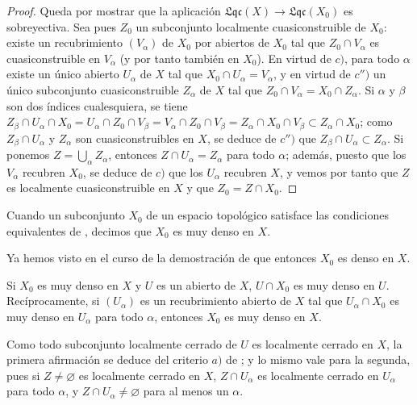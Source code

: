 \begin{proof}
Queda por mostrar que la aplicación $\mathfrak{Lqc}(X)\to\mathfrak{Lqc}(X_0)$ es sobreyectiva.
Sea pues $Z_0$ un subconjunto localmente cuasiconstruible de $X_0$: existe un recubrimiento $(V_\alpha)$ de $X_0$ por abiertos de $X_0$ tal que $Z_0\cap V_\alpha$ es cuasiconstruible en $V_\alpha$ (y
por tanto también en $X_0$).
En virtud de $c)$, para todo $\alpha$ existe un único abierto $U_\alpha$ de $X$ tal que $X_0\cap U_\alpha=V_\alpha$, y en virtud de $c'')$ un único subconjunto cuasiconstruible $Z_\alpha$ de $X$ tal que $Z_0\cap V_\alpha=X_0\cap Z_\alpha$.
Si $\alpha$ y $\beta$ son dos índices cualesquiera, se tiene $Z_\beta\cap U_\alpha\cap X_0=U_\alpha\cap Z_0\cap V_\beta=V_\alpha\cap Z_0\cap V_\beta=Z_\alpha\cap X_0\cap V_\beta\subset Z_\alpha\cap X_0$; como $Z_\beta\cap U_\alpha$ y $Z_\alpha$ son cuasiconstruibles en $X$, se deduce de $c'')$ que $Z_\beta\cap U_\alpha\subset Z_\alpha$.
Si ponemos $Z=\bigcup_\alpha Z_\alpha$, entonces $Z\cap U_\alpha=Z_\alpha$ para todo $\alpha$; además, puesto que los $V_\alpha$ recubren $X_0$, se deduce de $c)$ que los $U_\alpha$ recubren $X$, y vemos por tanto que $Z$ es localmente cuasiconstruible en $X$ y que $Z_0=Z\cap X_0$.
\end{proof}

\begin{definition}[10.1.3]
\label{IV.10.1.3}
Cuando un subconjunto $X_0$ de un espacio topológico satisface las condiciones equivalentes de , decimos que $X_0$ es muy denso en $X$.
\end{definition}

Ya hemos visto en el curso de la demostración de  que entonces $X_0$ es denso en $X$.

\begin{corollary}[10.1.4]
\label{IV.10.1.4}
Si $X_0$ es muy denso en $X$ y $U$ es un abierto de $X$, $U\cap X_0$ es muy denso en $U$.
Recíprocamente, si $(U_\alpha)$ es un recubrimiento abierto de $X$ tal que $U_\alpha\cap X_0$ es muy denso en $U_\alpha$ para todo $\alpha$, entonces $X_0$ es muy denso en $X$.
\end{corollary}

Como todo subconjunto localmente cerrado de $U$ es localmente cerrado en $X$, la primera afirmación se deduce del criterio $a)$ de ; y lo mismo vale para la segunda, pues si $Z\neq\varnothing$ es localmente cerrado en $X$, $Z\cap U_\alpha$ es localmente cerrado en $U_\alpha$ para todo $\alpha$, y $Z\cap U_\alpha\neq\varnothing$ para al menos un $\alpha$.

